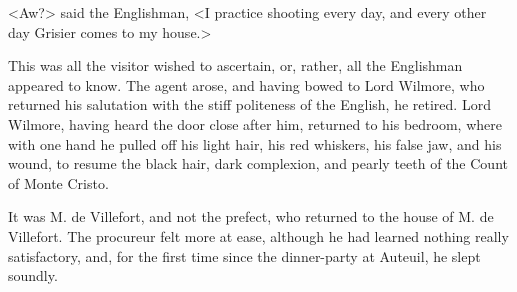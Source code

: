  <Aw?> said the Englishman, <I practice shooting every day, and every other day Grisier comes to my house.> 

 This was all the visitor wished to ascertain, or, rather, all the Englishman appeared to know. The agent arose, and having bowed to Lord Wilmore, who returned his salutation with the stiff politeness of the English, he retired. Lord Wilmore, having heard the door close after him, returned to his bedroom, where with one hand he pulled off his light hair, his red whiskers, his false jaw, and his wound, to resume the black hair, dark complexion, and pearly teeth of the Count of Monte Cristo. 

 It was M. de Villefort, and not the prefect, who returned to the house of M. de Villefort. The procureur felt more at ease, although he had learned nothing really satisfactory, and, for the first time since the dinner-party at Auteuil, he slept soundly. 